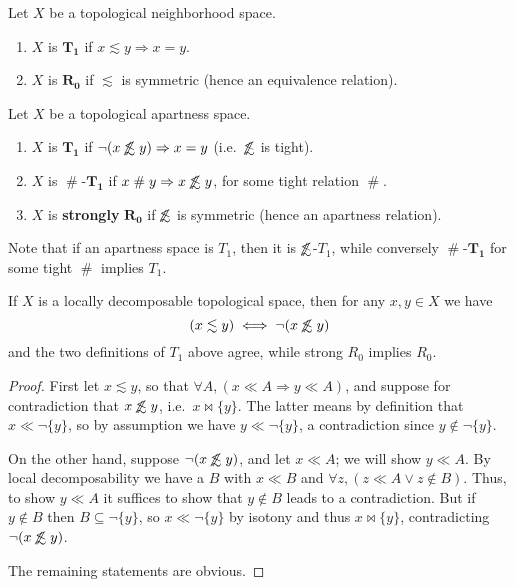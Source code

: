 \documentclass{article}
\def\apart{\mathrel{\#}}
\def\oapt{\mathrel{\!\not\,\not\lesssim}}
\def\leapx{\lesssim}
\def\cpl#1{\neg #1}
\let\implies\Rightarrow
\def\singleton#1{\{#1\}}
\begin{document}
\begin{defn}
  Let $X$ be a topological neighborhood space.
  \begin{enumerate}
  \item $X$ is $\mathbf{T_1}$ if $x\leapx y \implies x=y$.
  \item $X$ is $\mathbf{R_0}$ if $\leapx$ is symmetric (hence an equivalence relation).
  \end{enumerate}
  Let $X$ be a topological apartness space.
  \begin{enumerate}
  \item $X$ is $\mathbf{T_1}$ if $\neg(x\oapt y)\implies x=y$ (i.e.\ $\oapt$ is tight).
  \item $X$ is $\apart$-$\mathbf{T_1}$ if $x\apart y \implies x\oapt y$, for some tight relation $\apart$.
  \item $X$ is \textbf{strongly} $\mathbf{R_0}$ if $\oapt$ is symmetric (hence an apartness relation).
  \end{enumerate}
\end{defn}

Note that if an apartness space is $T_1$, then it is $\oapt$-$T_1$, while conversely $\apart$-$\mathbf{T_1}$ for some tight $\apart$ implies $T_1$.

\begin{thm}
  If $X$ is a locally decomposable topological space, then for any $x,y\in X$ we have
  \[ (x\leapx y) \iff \neg(x\oapt y) \]
  and the two definitions of $T_1$ above agree, while strong $R_0$ implies $R_0$.
\end{thm}
\begin{proof}
  First let $x\leapx y$, so that $\forall A, (x\ll A \implies y\ll A)$, and suppose for contradiction that $x\oapt y$, i.e.\ $x\bowtie \singleton{y}$.
  The latter means by definition that $x\ll \cpl{\singleton{y}}$, so by assumption we have $y\ll \cpl{\singleton{y}}$, a contradiction since $y\notin \cpl{\singleton{y}}$.

  On the other hand, suppose $\neg(x\oapt y)$, and let $x\ll A$; we will show $y\ll A$.
  By local decomposability we have a $B$ with $x\ll B$ and $\forall z, (z\ll A \lor z\notin B)$.
  Thus, to show $y\ll A$ it suffices to show that $y\notin B$ leads to a contradiction.
  But if $y\notin B$ then $B\subseteq \cpl{\singleton{y}}$, so $x\ll \cpl{\singleton{y}}$ by isotony and thus $x\bowtie \singleton{y}$, contradicting $\neg(x\oapt y)$.

  The remaining statements are obvious.
\end{proof}
\end{document}

